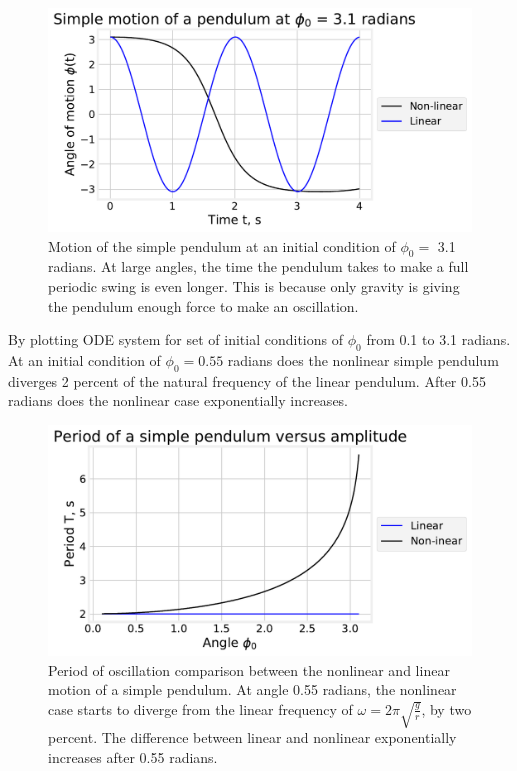 \documentclass[11pt]{article}
\begin{document}
\begin{figure}[H]
    \centering
    \includegraphics[width = 12 cm]{src/PendulumPb.pdf}
    \caption{Motion of the simple pendulum at an initial condition of $\phi_0 =$ 3.1 radians. At large angles, the time the pendulum takes to make a full periodic swing is even longer. This is because only gravity is giving the pendulum enough force to make an oscillation.}
    \label{fig:my_label}
\end{figure}
By plotting ODE system for set of initial conditions of $\phi_0$ from 0.1 to 3.1 radians. At an initial condition of $\phi_0 = 0.55$ radians does the nonlinear simple pendulum diverges 2 percent of the natural frequency of the linear pendulum. After 0.55 radians does the nonlinear case exponentially increases. 
\begin{figure}[H]
    \centering
    \includegraphics[width = 12 cm]{src/PendulumPc.pdf}
    \caption{Period of oscillation comparison between the nonlinear and linear motion of a simple pendulum. At angle 0.55 radians, the nonlinear case starts to diverge from the linear frequency of $\omega = 2\pi \sqrt{\frac{g}{r}}$, by two percent. The difference between linear and nonlinear exponentially increases after 0.55 radians.  }
    \label{fig:my_label}
\end{figure}
\end{document}
